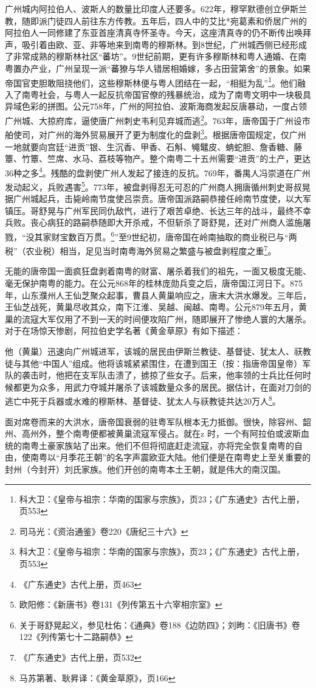 广州城内阿拉伯人、波斯人的数量比印度人还要多。622年，穆罕默德创立伊斯兰教，随即派门徒四人前往东方传教。五年后，四人中的艾比*宛葛素和侨居广州的阿拉伯人一同修建了东亚首座清真寺怀圣寺。今天，这座清真寺的仍不断传出唤拜声，吸引着由欧、亚、非等地来到南粤的穆斯林。到8世纪，广州城西侧已经形成了非常成熟的穆斯林社区“蕃坊”。9世纪前期，更有许多穆斯林和粤人通婚、在南粤置办产业，广州呈现一派“蕃獠与华人错居相婚嫁，多占田营第舍”的景象。如果帝国官吏胆敢阻挠他们，这些穆斯林便与粤人团结在一起，“相挺为乱”\footnote{科大卫：《皇帝与祖宗：华南的国家与宗族》，页23；《广东通史》古代上册，页553}。他们融入了南粤社会，与粤人一起反抗帝国官僚的残暴统治，成为了南粤文明中一块极具异域色彩的拼图。公元758年，广州的阿拉伯、波斯海商发起反唐暴动，一度占领广州城、大掠府库，逼使唐广州刺史韦利见弃城而逃\footnote{司马光：《资治通鉴》卷220《唐纪三十六》}。763年，唐帝国于广州设市舶使司，对广州的海外贸易展开了更为制度化的盘剥\footnote{科大卫：《皇帝与祖宗：华南的国家与宗族》，页23；《广东通史》古代上册，页553}。根据唐帝国规定，仅广州一地就要向宫廷“进贡”银、生沉香、甲香、石斛、䵶鼊皮、蚺蛇胆、詹香糖、藤簟、竹簟、竺席、水马、荔枝等物产。整个南粤二十五州需要“进贡”的土产，更达36种之多\footnote{《广东通史》古代上册，页463}。残酷的盘剥使广州人发起了接连的反抗。769年，番禺人冯崇道在广州发动起义，兵败遇害\footnote{欧阳修：《新唐书》卷131《列传第五十六宰相宗室》}。773年，被盘剥得忍无可忍的广州商人拥唐循州刺史哥叔晃据广州城起兵，击毙岭南节度使吕崇贲。唐帝国派路嗣恭接任岭南节度使，以大军镇压。哥舒晃与广州军民同仇敌忾，进行了艰苦卓绝、长达三年的战斗，最终不幸兵败。丧心病狂的路嗣恭随即大开杀戒，不但斩杀了哥舒晃，还对广州商人滥施屠戮，“没其家财宝数百万贯。\footnote{关于哥舒晃起义，参见杜佑：《通典》卷188《边防四》；刘昫：《旧唐书》卷122《列传第七十二路嗣恭》}”至9世纪初，唐帝国在岭南抽取的商业税已与“两税”（农业税）相当，足见当时南粤海外贸易之繁盛与被盘剥程度之重\footnote{《广东通史》古代上册，页532}。

无能的唐帝国一面疯狂盘剥着南粤的财富、屠杀着我们的祖先，一面又极度无能、毫无保护南粤的能力。在公元868年的桂林庞勋兵变之后，唐帝国江河日下。875年，山东濮州人王仙芝聚众起事，曹县人黄巢响应之，唐末大洪水爆发。三年后，王仙芝战死，黄巢尽收其众，南下江淮、吴越、闽越、南粤。公元879年五月，黄巢的流寇大军仅用了不到一天的时间便攻陷广州，随即展开了惨绝人寰的大屠杀。对于在场惊天惨剧，阿拉伯史学名著《黄金草原》有如下描述：

他（黄巢）迅速向广州城进军，该城的居民由伊斯兰教徒、基督徒、犹太人、祆教徒与其他“中国人”组成。他将该城紧紧围住，在遭到国王（按：指唐帝国皇帝）军队的袭击时，他把在支军队击溃了，掳掠了些女子。后来，他率领的士兵比任何时候都更为众多，用武力夺城并屠杀了该城数量众多的居民。据估计，在面对刀剑的逃亡中死于兵器或水难的穆斯林、基督徒、犹太人与祆教徒共达20万人\footnote{马苏第著、耿昇译：《黄金草原》，页166}。

面对席卷而来的大洪水，唐帝国衰弱的驻粤军队根本无力抵御。很快，除容州、韶州、高州外，整个南粤便都被黄巢流寇军侵占。就在z 时，一个有阿拉伯或波斯血统的南粤土豪家族站了出来。他们不但将彻底赶走流寇，亦将完全恢复南粤的自由，使南粤以“月季花王朝”的名字声震欧亚大陆。他们便是在南粤史上至关重要的封州（今封开）刘氏家族。他们开创的南粤本土王朝，就是伟大的南汉国。




